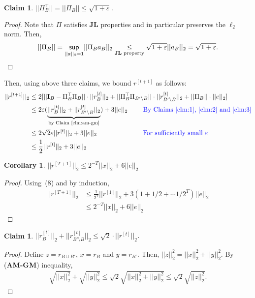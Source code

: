 \documentclass[11pt]{article}
\newcommand{\eps}{\varepsilon}
\newtheorem{corollary}[theorem]{Corollary}
\newtheorem{claim}[theorem]{Claim}
\begin{document}
\begin{claim}\label{clm:3}
$||\Pi^{\top}_B|| = ||\Pi_B|| \leq \sqrt{1+\eps}$.
\end{claim}
\begin{proof}
Note that $\Pi$ satisfies {\bf JL} properties and in particular preserves the $\ell_2$ norm. Then, 
\[
||\Pi_B|| = \underset{||a||_2 = 1}{\sf sup} ||\Pi_B a_B||_2 \underset{{\bf JL} \text{ property}}{\leq} \sqrt{1+\eps} ||a_B||_2 = \sqrt{1+\eps}.
\]
\end{proof}
Then, using above three claims, we bound $r^{[t+1]}$ as follows:
\begin{align}
||r^{[t+1]}||_2 &\leq 2 [|| {\bf I}_B - \Pi^{\top}_B \Pi_B|| \cdot ||r_B^{[t]}||_2 
						 + ||\Pi^{\top}_B \Pi_{B'\setminus B}|| \cdot ||r_{B'\setminus B}^{[t]}||_2 
			   			 + ||\Pi_B|| \cdot ||e||_2] \label{eq:claim_3}\nonumber \\
&\leq 2\eps(\underbrace{||r_B^{[t]}||_2 + ||r_{B'\setminus B}^{[t]}||_2}_{\text{by Claim~\ref{clm:am-gm}}}) + 3||e||_2 \quad\quad~\text{\color{blue} By Claims~\ref{clm:1},~\ref{clm:2} and~\ref{clm:3}}\nonumber\\
&\leq 2\sqrt{2} \eps ||r^{[t]}||_2 + 3||e||_2 \qquad\qquad\quad\qquad \text{\color{blue} For sufficiently small $\eps$}\nonumber\\
&\leq \frac{1}{2} ||r^{[t]}||_2 + 3||e||_2
\end{align}


\begin{corollary}
$||r^{[T+1]}||_2 \leq 2^{-T}||x||_2 + 6 ||e||_2$
\end{corollary}
\begin{proof}
Using~(8) and by induction, 
\begin{align*}
||r^{[T+1]}||_2 &\leq \frac{1}{2^{T}}||r^{[1]}||_2 + 3 (1+1/2 +\cdots 1/2^{T}) ||e||_2 \\
&\leq 2^{-T}||x||_2 + 6 ||e||_2
\end{align*}
\end{proof}

\begin{claim}\label{clm:am-gm}
$||r_B^{[t]}||_2 + ||r_{B'\setminus B}^{[t]}||_2 \leq  \sqrt{2} \cdot ||r^{[t]}||_2$.
\end{claim}
\begin{proof}
Define $z = r_{B\cup B'}$, $x = r_B$ and $y = r_{B'}$. Then, $||z||_2^2 = ||x||_2^2 + ||y||_2^2$. By ({\bf AM-GM}) inequality, 
\begin{align*}
\sqrt{||x||^2_2} + \sqrt{||y||^2_2} \leq \sqrt{2} \sqrt{||x||^2_2 + ||y||^2_2} \leq \sqrt{2} \sqrt{||z||_2^2}.
\end{align*}
\end{proof}
\end{document}

